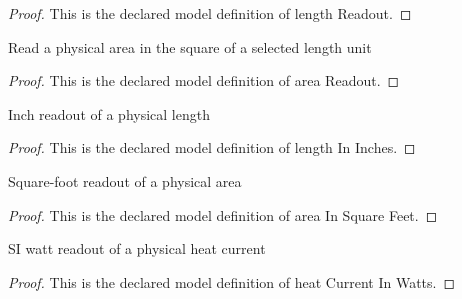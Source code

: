 \begin{proof}
  This is the declared model definition of length Readout.
\end{proof}
\begin{definition}
  \label{def:physics:phyx-mini-0487:phyxminiproblems-problemphyxmini0487-areareadout}
  Read a physical area in the square of a selected length unit
\end{definition}
\begin{proof}
  This is the declared model definition of area Readout.
\end{proof}
\begin{definition}
  \label{def:physics:phyx-mini-0487:phyxminiproblems-problemphyxmini0487-lengthininches}
  Inch readout of a physical length
\end{definition}
\begin{proof}
  This is the declared model definition of length In Inches.
\end{proof}
\begin{definition}
  \label{def:physics:phyx-mini-0487:phyxminiproblems-problemphyxmini0487-areainsquarefeet}
  Square-foot readout of a physical area
\end{definition}
\begin{proof}
  This is the declared model definition of area In Square Feet.
\end{proof}
\begin{definition}
  \label{def:physics:phyx-mini-0487:phyxminiproblems-problemphyxmini0487-heatcurrentinwatts}
  SI watt readout of a physical heat current
\end{definition}
\begin{proof}
  This is the declared model definition of heat Current In Watts.
\end{proof}
